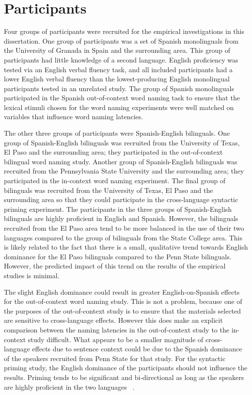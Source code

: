 \section{Participants}
\label{participants}

Four groups of participants were recruited for the empirical investigations in this dissertation. One group of participants was a set of Spanish monolinguals from the University of Granada in Spain and the surrounding area. This group of participants had little knowledge of a second language. English proficiency was tested via an English verbal fluency task, and all included participants had a lower English verbal fluency than the lowest-producing English monolingual participants tested in an unrelated study. The group of Spanish monolinguals participated in the Spanish out-of-context word naming task to ensure that the lexical stimuli chosen for the word naming experiments were well matched on variables that influence word naming latencies. 

The other three groups of participants were Spanish-English bilinguals. One group of Spanish-English bilinguals was recruited from the University of Texas, El Paso and the surrounding area; they participated in the out-of-context bilingual word naming study. Another group of Spanish-English bilinguals was recruited from the Pennsylvania State University and the surrounding area; they participated in the in-context word naming experiment. The final group of bilinguals was recruited from the University of Texas, El Paso and the surrounding area so that they could participate in the cross-language syntactic priming experiment. The participants in the three groups of Spanish-English bilinguals are highly proficient in English and Spanish. However, the bilinguals recruited from the El Paso area tend to be more balanced in the use of their two languages compared to the group of bilinguals from the State College area. This is likely related to the fact that there is a small, qualitative trend towards English dominance for the El Paso bilinguals compared to the Penn State bilinguals. However, the predicted impact of this trend on the results of the empirical studies is minimal. 

The slight English dominance could result in greater English-on-Spanish effects for the out-of-context word naming study. This is not a problem, because one of the purposes of the out-of-context study is to ensure that the materials selected are sensitive to cross-language effects. However this does make an explicit comparison between the naming latencies in the out-of-context study to the in-context study difficult. What appears to be a smaller magnitude of cross-language effects due to sentence context could be due to the Spanish dominance of the speakers recruited from Penn State for that study. For the syntactic priming study, the English dominance of the participants should not influence the results. Priming tends to be significant and bi-directional as long as the speakers are highly proficient in the two languages ~\citep[e.g.,][]{Bernolet2013}.


